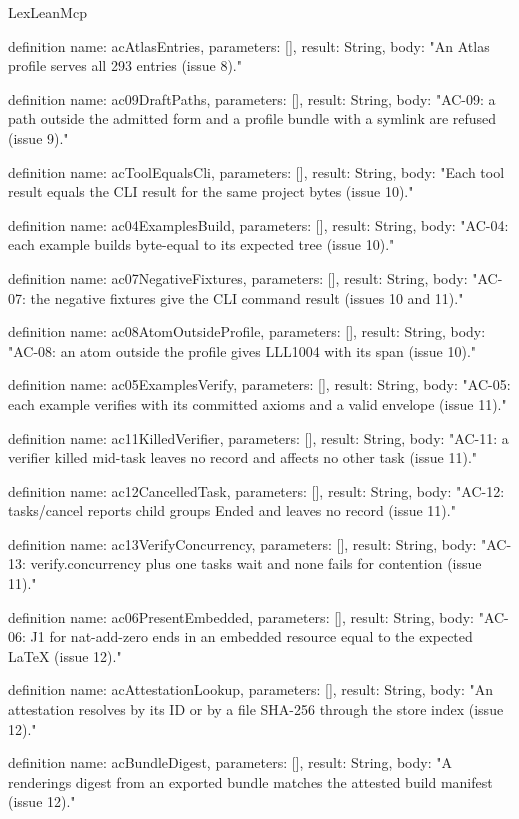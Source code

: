 \begin{lexlean}{LexLeanMcp}
\begin{semanticmodule}
definition{
  name: acAtlasEntries,
  parameters: [],
  result: String,
  body: "An Atlas profile serves all 293 entries (issue 8)."
}

definition{
  name: ac09DraftPaths,
  parameters: [],
  result: String,
  body: "AC-09: a path outside the admitted form and a profile bundle with a symlink are refused (issue 9)."
}

definition{
  name: acToolEqualsCli,
  parameters: [],
  result: String,
  body: "Each tool result equals the CLI result for the same project bytes (issue 10)."
}

definition{
  name: ac04ExamplesBuild,
  parameters: [],
  result: String,
  body: "AC-04: each example builds byte-equal to its expected tree (issue 10)."
}

definition{
  name: ac07NegativeFixtures,
  parameters: [],
  result: String,
  body: "AC-07: the negative fixtures give the CLI command result (issues 10 and 11)."
}

definition{
  name: ac08AtomOutsideProfile,
  parameters: [],
  result: String,
  body: "AC-08: an atom outside the profile gives LLL1004 with its span (issue 10)."
}

definition{
  name: ac05ExamplesVerify,
  parameters: [],
  result: String,
  body: "AC-05: each example verifies with its committed axioms and a valid envelope (issue 11)."
}

definition{
  name: ac11KilledVerifier,
  parameters: [],
  result: String,
  body: "AC-11: a verifier killed mid-task leaves no record and affects no other task (issue 11)."
}

definition{
  name: ac12CancelledTask,
  parameters: [],
  result: String,
  body: "AC-12: tasks/cancel reports child groups Ended and leaves no record (issue 11)."
}

definition{
  name: ac13VerifyConcurrency,
  parameters: [],
  result: String,
  body: "AC-13: verify.concurrency plus one tasks wait and none fails for contention (issue 11)."
}

definition{
  name: ac06PresentEmbedded,
  parameters: [],
  result: String,
  body: "AC-06: J1 for nat-add-zero ends in an embedded resource equal to the expected LaTeX (issue 12)."
}

definition{
  name: acAttestationLookup,
  parameters: [],
  result: String,
  body: "An attestation resolves by its ID or by a file SHA-256 through the store index (issue 12)."
}

definition{
  name: acBundleDigest,
  parameters: [],
  result: String,
  body: "A renderings digest from an exported bundle matches the attested build manifest (issue 12)."
}


\end{semanticmodule}
\end{lexlean}

